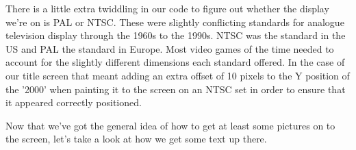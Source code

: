 There is a little extra twiddling in our code to figure out whether the display we're on is PAL or NTSC. These were slightly conflicting standards for
analogue television display through the 1960s to the 1990s. NTSC was the standard in the US and PAL the standard in Europe. Most video games of the time 
needed to account for the slightly different dimensions each standard offered. In the case of our title screen that meant adding an extra offset of 10
pixels to the Y position of the '2000' when painting it to the screen on an NTSC set in order to ensure that it appeared correctly positioned.

Now that we've got the general idea of how to get at least some pictures on to the screen, let's take a look at how we get some text up there.

